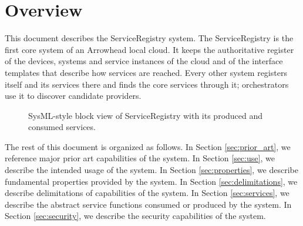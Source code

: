 \documentclass[a4paper]{arrowhead}
\begin{document}
\section{Overview}
\label{sec:overview}

This document describes the ServiceRegistry system. The ServiceRegistry is the first core system of an Arrowhead local cloud. It keeps the authoritative register of the devices, systems and service instances of the cloud and of the interface templates that describe how services are reached. Every other system registers itself and its services there and finds the core services through it; orchestrators use it to discover candidate providers.

\begin{figure}[ht!]
  \centering
  \caption{SysML-style block view of ServiceRegistry with its produced and consumed services.}
  \label{fig:system}
\end{figure}

The rest of this document is organized as follows.
In Section \ref{sec:prior_art}, we reference major prior art capabilities of the system.
In Section \ref{sec:use}, we describe the intended usage of the system.
In Section \ref{sec:properties}, we describe fundamental properties provided by the system.
In Section \ref{sec:delimitations}, we describe delimitations of capabilities of the system.
In Section \ref{sec:services}, we describe the abstract service functions consumed or produced by the system.
In Section \ref{sec:security}, we describe the security capabilities of the system.
\end{document}

